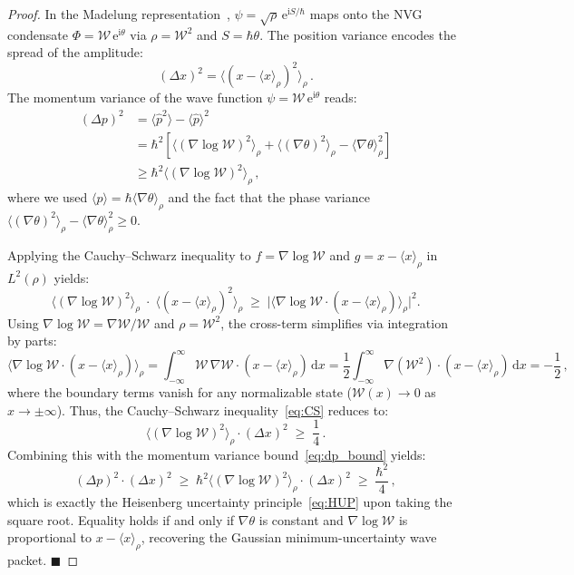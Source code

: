 \documentclass[12pt,a4paper]{article}
\theoremstyle{plain}
\theoremstyle{definition}
\theoremstyle{remark}
\newcommand{\hb}{\hbar}
\newcommand{\Wc}{\mathcal{W}}
\newcommand{\dd}{\mathrm{d}}
\newcommand{\ee}{\mathrm{e}}
\newcommand{\ii}{\mathrm{i}}
\newcommand{\QED}{\hfill$\blacksquare$}
\begin{document}
\begin{proof}
In the Madelung representation~\cite{Madelung1927},
$\psi = \sqrt{\rho}\,\ee^{\ii S/\hb}$ maps onto the NVG condensate
$\Phi = \Wc\,\ee^{\ii\theta}$ via $\rho = \Wc^2$ and $S = \hb\theta$.
The position variance encodes the spread of the amplitude:
\begin{equation}
  (\Delta x)^2
  = \langle (x - \langle x \rangle_\rho)^2 \rangle_\rho\,.
\end{equation}
The momentum variance of the wave function $\psi = \Wc\,\ee^{\ii\theta}$ reads:
\begin{align}
  (\Delta p)^2 &= \langle \hat{p}^2 \rangle - \langle \hat{p} \rangle^2 \nonumber \\
  &= \hb^2 \left[ \langle (\nabla\log\Wc)^2 \rangle_\rho + \langle (\nabla\theta)^2 \rangle_\rho - \langle\nabla\theta\rangle_\rho^2 \right] \nonumber \\
  &\geq \hb^2 \langle (\nabla\log\Wc)^2 \rangle_\rho\,,\label{eq:dp_bound}
\end{align}
where we used $\langle\hat{p}\rangle = \hb\langle\nabla\theta\rangle_\rho$ and the fact that the phase variance $\langle(\nabla\theta)^2\rangle_\rho - \langle\nabla\theta\rangle_\rho^2 \geq 0$.

Applying the Cauchy--Schwarz inequality to $f = \nabla\!\log\Wc$ and $g = x - \langle x \rangle_\rho$ in $L^2(\rho)$ yields:
\begin{equation}\label{eq:CS}
  \langle(\nabla\!\log\Wc)^2\rangle_\rho
  \;\cdot\;
  \langle(x - \langle x \rangle_\rho)^2\rangle_\rho
  \;\geq\;
  \bigl|\langle\nabla\!\log\Wc \cdot (x - \langle x \rangle_\rho) \rangle_\rho\bigr|^2.
\end{equation}
Using $\nabla\!\log\Wc = \nabla\Wc/\Wc$ and $\rho = \Wc^2$, the cross-term simplifies via integration by parts:
\begin{equation}
  \langle\nabla\!\log\Wc \cdot (x - \langle x \rangle_\rho) \rangle_\rho
  = \int_{-\infty}^{\infty} \Wc\,\nabla\Wc \cdot (x - \langle x \rangle_\rho)\,\dd x
  = \frac{1}{2} \int_{-\infty}^{\infty} \nabla(\Wc^2) \cdot (x - \langle x \rangle_\rho)\,\dd x
  = -\frac{1}{2}\,,
\end{equation}
where the boundary terms vanish for any normalizable state ($\Wc(x) \to 0$ as $x \to \pm\infty$). Thus, the Cauchy--Schwarz inequality~\eqref{eq:CS} reduces to:
\begin{equation}\label{eq:HUP_CS_bound}
  \langle(\nabla\!\log\Wc)^2\rangle_\rho \cdot (\Delta x)^2 \;\geq\; \frac{1}{4}\,.
\end{equation}
Combining this with the momentum variance bound~\eqref{eq:dp_bound} yields:
\begin{equation}
  (\Delta p)^2 \cdot (\Delta x)^2 \;\geq\; \hb^2 \langle(\nabla\!\log\Wc)^2\rangle_\rho \cdot (\Delta x)^2 \;\geq\; \frac{\hb^2}{4}\,,
\end{equation}
which is exactly the Heisenberg uncertainty principle~\eqref{eq:HUP} upon taking the square root. Equality holds if and only if $\nabla\theta$ is constant and $\nabla\log\Wc$ is proportional to $x - \langle x \rangle_\rho$, recovering the Gaussian minimum-uncertainty wave packet.
\QED
\end{proof}
\end{document}
